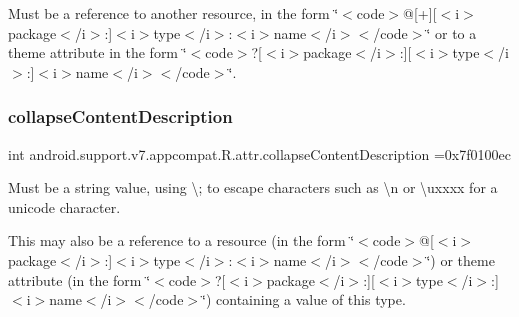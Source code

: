 Must be a reference to another resource, in the form \char`\"{}$<$code$>$@\mbox{[}+\mbox{]}\mbox{[}$<$i$>$package$<$/i$>$\+:\mbox{]}$<$i$>$type$<$/i$>$\+:$<$i$>$name$<$/i$>$$<$/code$>$\char`\"{} or to a theme attribute in the form \char`\"{}$<$code$>$?\mbox{[}$<$i$>$package$<$/i$>$\+:\mbox{]}\mbox{[}$<$i$>$type$<$/i$>$\+:\mbox{]}$<$i$>$name$<$/i$>$$<$/code$>$\char`\"{}. \mbox{\label{classandroid_1_1support_1_1v7_1_1appcompat_1_1R_1_1attr_abfab8bcf888197819e6a627d3eeaa4ef}} 
\subsubsection{\texorpdfstring{collapse\+Content\+Description}{collapseContentDescription}}
{\footnotesize\ttfamily int android.\+support.\+v7.\+appcompat.\+R.\+attr.\+collapse\+Content\+Description =0x7f0100ec\hspace{0.3cm}{\ttfamily [static]}}

Must be a string value, using \textquotesingle{}\textbackslash{};\textquotesingle{} to escape characters such as \textquotesingle{}\textbackslash{}n\textquotesingle{} or \textquotesingle{}\textbackslash{}uxxxx\textquotesingle{} for a unicode character. 

This may also be a reference to a resource (in the form \char`\"{}$<$code$>$@\mbox{[}$<$i$>$package$<$/i$>$\+:\mbox{]}$<$i$>$type$<$/i$>$\+:$<$i$>$name$<$/i$>$$<$/code$>$\char`\"{}) or theme attribute (in the form \char`\"{}$<$code$>$?\mbox{[}$<$i$>$package$<$/i$>$\+:\mbox{]}\mbox{[}$<$i$>$type$<$/i$>$\+:\mbox{]}$<$i$>$name$<$/i$>$$<$/code$>$\char`\"{}) containing a value of this type. \mbox{\label{classandroid_1_1support_1_1v7_1_1appcompat_1_1R_1_1attr_a16879d02e8655519f27ea1d008c230e4}} 
